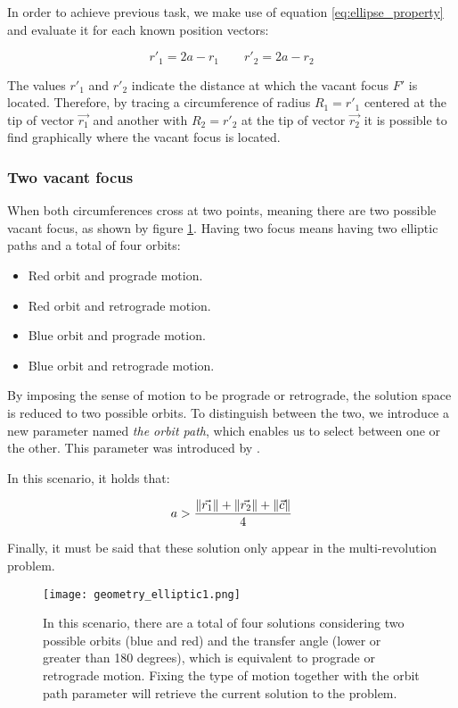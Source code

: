In order to achieve previous task, we make use of equation
\ref{eq:ellipse_property} and evaluate it for each known position vectors:

\begin{equation}
  r'_{1} = 2a - r_{1}\quad\quad
  r'_{2} = 2a - r_{2}
\end{equation}

The values $r'_{1}$ and $r'_{2}$ indicate the distance at which the vacant focus
$F'$ is located. Therefore, by tracing a circumference of radius $R_{1} = r'_{1}$
centered at the tip of vector $\vec{r_{1}}$ and another with $R_{2} = r'_{2}$ at
the tip of vector $\vec{r_{2}}$ it is possible to find graphically where the
vacant focus is located.

\subsubsection{Two vacant focus}
When both circumferences cross at two points, meaning there are two possible
vacant focus, as shown by figure \ref{fig:elliptic_geometry_1}. Having two focus
means having two elliptic paths and a total of four orbits:

\begin{itemize}
  \item Red orbit and prograde motion.
  \item Red orbit and retrograde motion.
  \item Blue orbit and prograde motion.
  \item Blue orbit and retrograde motion.
\end{itemize}

By imposing the sense of motion to be prograde or retrograde, the solution space
is reduced to two possible orbits. To distinguish between the two, we introduce
a new parameter named \textit{the orbit path}, which enables us to select
between one or the other. This parameter was introduced by \cite{sun1977}.

In this scenario, it holds that:

\begin{equation}
  a > \frac{\lVert\vec{r_{1}}\rVert + \lVert\vec{r_{2}}\rVert + \lVert\vec{c}\rVert}{4}
\end{equation}

Finally, it must be said that these solution only appear in the
multi-revolution problem.

\begin{figure}[H]
  \centering
  \texttt{[image: geometry\_elliptic1.png]}
  \caption{
    In this scenario, there are a total of four solutions considering two
    possible orbits (blue and red) and the transfer angle (lower or greater than
    180 degrees), which is equivalent to prograde or retrograde motion. Fixing
    the type of motion together with the orbit path parameter will retrieve the
    current solution to the problem.
  }
  \label{fig:elliptic_geometry_1}
\end{figure}

